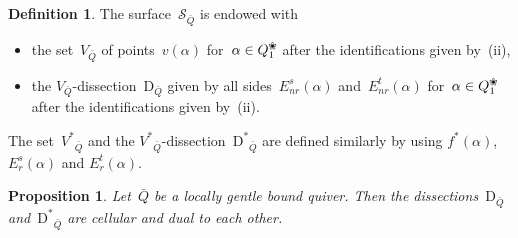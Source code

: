 \documentclass{amsart}
\newtheorem{proposition}[theorem]{Proposition}
\theoremstyle{definition}
\newtheorem{definition}[theorem]{Definition}
\newcommand{\blossom}{^\text{\ding{96}}} %
\newcommand{\Enrs}[1]{E_{nr}^{s}(#1)}
\newcommand{\Ers}[1]{E_{r}^{s}(#1)}
\newcommand{\Enrt}[1]{E_{nr}^{t}(#1)}
\newcommand{\Ert}[1]{E_{r}^{t}(#1)}
\newcommand{\surface}{\mathcal{S}} %
\newcommand{\dual}{^*} %
\newcommand{\dissection}{\mathrm{D}} %
\begin{document}
\begin{definition}
\label{def:dissectionQuiver}
The surface~$\surface_{\bar Q}$ is endowed with
\begin{itemize}
\item the set~$V_{\bar Q}$ of points~$v(\alpha)$ for~$\alpha \in Q_1\blossom$ after the identifications given by~(ii),
\item the $V_{\bar Q}$-dissection~$\dissection_{\bar Q}$ given by all sides~$\Enrs{\alpha}$ and~$\Enrt{\alpha}$ for~$\alpha \in Q_1\blossom$ after the identifications given by~(ii).
\end{itemize}
The set~${{V\dual}\!\!_{\bar Q}}$ and the ${{V\dual}\!\!_{\bar Q}}$-dissection~${\dissection\dual\!\!_{\bar Q}}$ are defined similarly by using $f\dual(\alpha)$, $\Ers{\alpha}$ and $\Ert{\alpha}$.
\end{definition}

\begin{proposition}
\label{prop:dissectionsAreCellular}
Let~$\bar Q$ be a locally gentle bound quiver.
Then the dissections~$\dissection_{\bar Q}$ and~$\dissection\dual\!\!_{\bar Q}$ are cellular and dual to each other.
\end{proposition}
\end{document}
